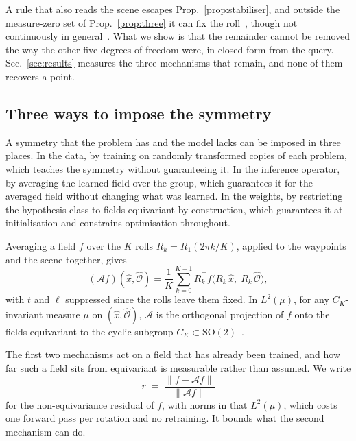 \documentclass[conference]{IEEEtran}
\begin{document}
A rule that also reads the scene escapes Prop.~\ref{prop:stabiliser}, and
outside the measure-zero set of Prop.~\ref{prop:three} it can fix the
roll~\cite{kaba2023canon}, though not continuously in
general~\cite{dym2024frames}. What we show is that the remainder cannot be
removed the way the other five degrees of freedom were, in closed form from the
query. Sec.~\ref{sec:results} measures the
three mechanisms that remain, and none of them recovers a point.

\subsection{Three ways to impose the symmetry}
\label{sec:threeways}
A symmetry that the problem has and the model lacks can be imposed in three
places. In the data, by training on randomly transformed copies of each problem,
which teaches the symmetry without guaranteeing it. In the inference operator, by
averaging the learned field over the group, which guarantees it for the averaged
field without changing what was learned. In the weights, by restricting the
hypothesis class to fields equivariant by construction, which guarantees it at
initialisation and constrains optimisation throughout.

Averaging a field $f$ over the $K$ rolls $R_k = R_1(2\pi k / K)$, applied to
the waypoints and the scene together, gives
\begin{equation}
  (\mathcal{A}f)(\hat{x}, \hat{\mathcal{O}}) = \frac{1}{K} \sum_{k=0}^{K-1}
  R_k^{\top} f\big(R_k\,\hat{x},\; R_k\,\hat{\mathcal{O}}\big) ,
  \label{eq:frame-averaging}
\end{equation}
with $t$ and $\ell$ suppressed since the rolls leave them fixed. In
$L^2(\mu)$, for any $C_K$-invariant measure $\mu$ on $(\hat{x}, \hat{\mathcal{O}})$,
$\mathcal{A}$ is the orthogonal projection of $f$ onto the fields equivariant to
the cyclic subgroup $C_K \subset \mathrm{SO}(2)$~\cite{puny2022fa}.

The first two mechanisms act on a field that has already been trained, and how
far such a field sits from equivariant is measurable rather than assumed. We
write
\begin{equation}
  r \;=\; \frac{\|f - \mathcal{A}f\|}{\|\mathcal{A}f\|}
  \label{eq:residual-def}
\end{equation}
for the non-equivariance residual of $f$, with norms in that $L^2(\mu)$, which
costs one forward pass per rotation and no retraining. It bounds what the second mechanism can do.
\end{document}
